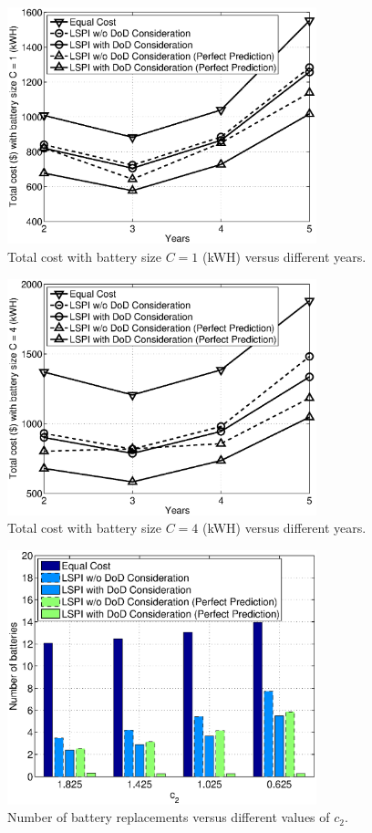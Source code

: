 \begin{figure}[t]
  \centering
  \includegraphics[width = 0.8\textwidth]{fig/total_cost_1.eps}
  \caption{Total cost with battery size $C = 1$ (kWH) versus different years.}
  \label{fig: total_cost_1}
\end{figure}

\begin{figure}[t]
  \centering
  \includegraphics[width = 0.8\textwidth]{fig/total_cost_2.eps}
  \caption{Total cost with battery size $C = 4$ (kWH) versus different years.}
  \label{fig: total_cost_2}
\end{figure}

\begin{figure}[t]
  \centering
  \includegraphics[width = 0.8\textwidth]{fig/num_of_batt.eps}
  \caption{Number of battery replacements versus different values of $c_2$.}
  \label{fig:num_of_batt}
\end{figure}

